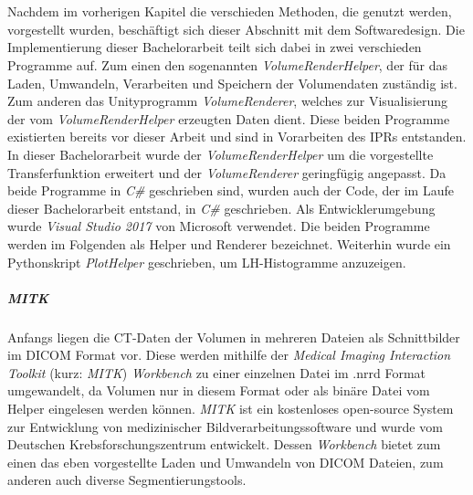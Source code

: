 \chapter{}
\label{sec:concept}


Nachdem im vorherigen Kapitel die verschieden Methoden, die genutzt werden, vorgestellt wurden, beschäftigt sich dieser Abschnitt mit dem Softwaredesign.
\newline
Die Implementierung dieser Bachelorarbeit teilt sich dabei in zwei verschieden Programme auf. Zum einen den sogenannten \textit{VolumeRenderHelper}, der für das Laden, Umwandeln, Verarbeiten und Speichern der Volumendaten zuständig ist.
Zum anderen das Unityprogramm \textit{VolumeRenderer}, welches zur Visualisierung der vom \textit{VolumeRenderHelper} erzeugten Daten dient. Diese beiden Programme existierten bereits vor dieser Arbeit und sind in Vorarbeiten des IPRs entstanden.
\newline
In dieser Bachelorarbeit wurde der \textit{VolumeRenderHelper} um die vorgestellte Transferfunktion erweitert und der \textit{VolumeRenderer} geringfügig angepasst. Da beide Programme in \textit{C\#} geschrieben sind, wurden auch der Code, der im Laufe dieser Bachelorarbeit entstand, in \textit{C\#} geschrieben. Als Entwicklerumgebung wurde \textit{Visual Studio 2017} von Microsoft verwendet. Die beiden Programme werden im Folgenden als Helper und Renderer bezeichnet. Weiterhin wurde ein Pythonskript \textit{PlotHelper} geschrieben, um LH-Histogramme anzuzeigen.

\paragraph{MITK}
Anfangs liegen die CT-Daten der Volumen in mehreren Dateien als Schnittbilder im DICOM Format vor. Diese werden mithilfe der \textit{Medical Imaging Interaction Toolkit} (kurz: \textit{MITK}) \textit{Workbench} \cite{mitk} zu einer einzelnen Datei im .nrrd Format umgewandelt, da Volumen nur in diesem Format oder als binäre Datei vom Helper eingelesen werden können.
\textit{MITK} ist ein kostenloses open-source System zur Entwicklung von medizinischer Bildverarbeitungssoftware und wurde vom Deutschen Krebsforschungszentrum entwickelt. Dessen \textit{Workbench} bietet zum einen das eben vorgestellte Laden und Umwandeln von DICOM Dateien, zum anderen auch diverse Segmentierungstools.

